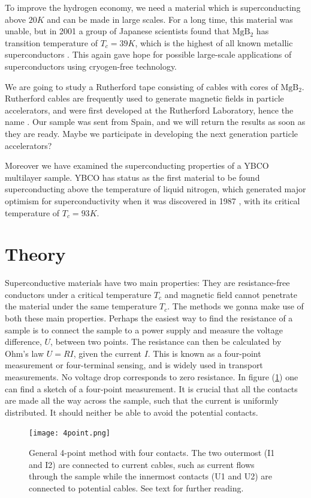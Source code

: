 \documentclass{comjnl}
\newcommand*\chem[1]{\ensuremath{\mathrm{#1}}}
\begin{document}
To improve the hydrogen economy, we need a material which is superconducting above $20K$ and can be made in large scales. For a long time, this material was unable, but in 2001 a group of Japanese scientists found that \chem{MgB_2} has transition temperature of $T_c=39K$, which is the highest of all known metallic superconductors \cite {jsap}\cite {nature}. This again gave hope for possible large-scale applications of superconductors using cryogen-free technology. 

We are going to study a Rutherford tape consisting of cables with cores of \chem{MgB_2}. Rutherford cables are frequently used to generate magnetic fields in particle accelerators, and were first developed at the Rutherford Laboratory, hence the name \cite {fnal}. Our sample was sent from Spain, and we will return the results as soon as they are ready. Maybe we participate in developing the next generation particle accelerators?

Moreover we have examined the superconducting properties of a YBCO multilayer sample. YBCO has status as the first material to be found superconducting above the temperature of liquid nitrogen, which generated major optimism for superconductivity when it was discovered in 1987 \cite{harvard}, with its critical temperature of $T_c=93K$. 

\section{Theory}\label{Sec:Theory}
Superconductive materials have two main properties: They are resistance-free conductors under a critical temperature $T_c$ and magnetic field cannot penetrate the material under the same temperature $T_c$. The methods we gonna make use of both these main properties. Perhaps the easiest way to find the resistance of a sample is to connect the sample to a power supply and measure the voltage difference, $U$, between two points. The resistance can then be calculated by Ohm's law $U=RI$, given the current $I$. This is known as a four-point measurement or four-terminal sensing, and is widely used in transport measurements. No voltage drop corresponds to zero resistance. In figure (\ref{fig:4point}) one can find a sketch of a four-point measurement. It is crucial that all the contacts are made all the way across the sample, such that the current is uniformly distributed. It should neither be able to avoid the potential contacts.
\begin{figure}[h]
\centering
\texttt{[image: 4point.png]}
\caption{General 4-point method with four contacts. The two outermost (I1 and I2) are connected to current cables, such as current flows through the sample while the innermost contacts (U1 and U2) are connected to potential cables. See text for further reading. \label{fig:4point}}
\end{figure}
\end{document}
